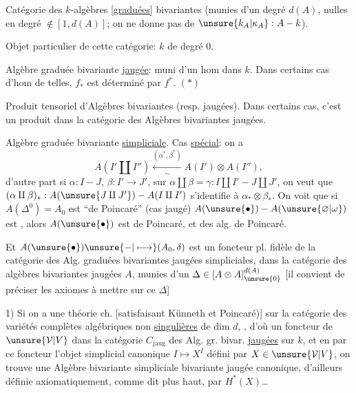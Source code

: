 Catégorie des $k$-algèbres [\uline{graduées}] bivariantes  (munies d'un degré $d(A)$, nulles en degré $\notin[1,d(A)]$; on ne donne pas de $\unsure{k_A|\kappa_A}:A\mathbin{-}k$).

Objet particulier de cette catégorie: $k$ de degré $0$.

Algèbre graduée bivariante \uline{jaugée}: muni d'un hom dans $k$.
Dans certains cas d'hom de telles, $f_*$ est déterminé par $f^*$. $(*)$

Produit tensoriel d'Algèbres bivariantes (resp. jaugées). Dans certains cas, c'est un produit dans la catégorie des Algèbres bivariantes jaugées.

Algèbre graduée bivariante  \uline{simpliciale}.  Cas \uline{spécial}: on a
\[
A(I'\amalg I'')\xleftarrow[\sim]{(\alpha^*,\beta^*)}A(I')\otimes A(I''),
\]
d'autre part si $\alpha:I\mathbin{-}J$, $\beta:I'\longrightarrow J'$, sur $\alpha\amalg\beta=\gamma:I\amalg I'\mathbin{-}J\amalg J'$, on veut que $(\alpha\amalg\beta)_*:A(\unsure{J\amalg J'})\mathbin{-}A(I\amalg I')$ s'identifie à $\alpha_*\otimes\beta_*$. On voit que si $A(\Delta^0)=A_0$ est ``de Poincaré'' (cas jaugé) $A(\unsure{\bullet})\mathbin{-}A(\unsure{\varnothing|\omega})$ est , alors $A(\unsure{\bullet})$ est  de Poincaré, et des alg. de Poincaré.

Et $A(\unsure{\bullet})\unsure{\mathbin{-}|\longmapsto}(A_0,\delta)$ est un foncteur pl. fidèle de la catégorie des Alg. graduées bivariantes jaugées simpliciales, dans la catégorie des algèbres  bivariantes jaugées $A$, munies d'un $\Delta\in[A\otimes A]^{d(A)}_{\unsure{0}}$ [il convient de préciser les axiomes à mettre sur ce $\Delta$]

 1) Si on a une théorie ch.  [satisfaisant Künneth et Poincaré)] sur la catégorie  des variétés complètes algébriques non \uline{singulières} de dim $d$,  , d'où un foncteur  de $\unsure{\mathcal V|V}$ dans la catégorie $C_{\mathrm{jaug}}$ des Alg. gr. bivar. \uline{jaugées} sur $k$, et en  par ce foncteur l'objet simplicial canonique $I\longmapsto X^I$ défini par $X\in\unsure{\mathcal V|V}$, on trouve une Algèbre bivariante simpliciale bivariante jaugée canonique, d'ailleurs définie axiomatiquement, comme dit plus haut, par  $H^*(X)$\ldots
{}

